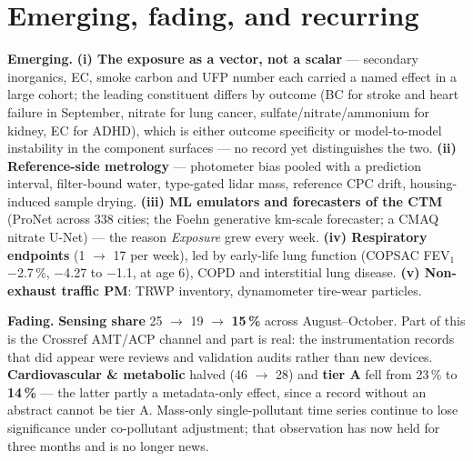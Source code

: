 \documentclass[10pt]{article}
\begin{document}
\clearpage

\section*{\sffamily\bfseries\color{Deep}Emerging, fading, and recurring}
\vspace{-1.5mm}{\color{Coral}\rule{\linewidth}{1.1pt}}\vspace{2.5mm}

\footnotesize
\textbf{Emerging.} \textbf{(i) The exposure as a vector, not a scalar} --- secondary inorganics, EC, smoke
carbon and UFP number each carried a named effect in a large cohort; the leading constituent differs by
outcome (BC for stroke and heart failure in September, nitrate for lung cancer, sulfate/nitrate/ammonium for
kidney, EC for ADHD), which is either outcome specificity or model-to-model instability in the component
surfaces --- no record yet distinguishes the two. \textbf{(ii) Reference-side metrology} --- photometer
bias pooled with a prediction interval, filter-bound water, type-gated lidar mass, reference CPC drift,
housing-induced sample drying. \textbf{(iii) ML emulators and forecasters of the CTM} (ProNet across 338
cities; the Foehn generative km-scale forecaster; a CMAQ nitrate U-Net) --- the reason \textit{Exposure}
grew every week. \textbf{(iv) Respiratory endpoints} (1 $\rightarrow$ 17 per week), led by early-life lung
function (COPSAC FEV$_1$ $-$2.7\,\%, $-$4.27 to $-$1.1, at age 6), COPD and interstitial lung disease.
\textbf{(v) Non-exhaust traffic PM}: TRWP inventory, dynamometer tire-wear particles.

\vspace{2mm}
\textbf{Fading.} \textbf{Sensing share} 25 $\rightarrow$ 19 $\rightarrow$ \textbf{15\,\%} across August--October.
Part of this is the Crossref AMT/ACP channel and part is real: the instrumentation records that did appear
were reviews and validation audits rather than new devices. \textbf{Cardiovascular \& metabolic} halved
(46 $\rightarrow$ 28) and \textbf{tier A} fell from 23\,\% to \textbf{14\,\%} --- the latter partly a
metadata-only effect, since a record without an abstract cannot be tier A. Mass-only single-pollutant
time series continue to lose significance under co-pollutant adjustment; that observation has now held for
three months and is no longer news.
\end{document}
